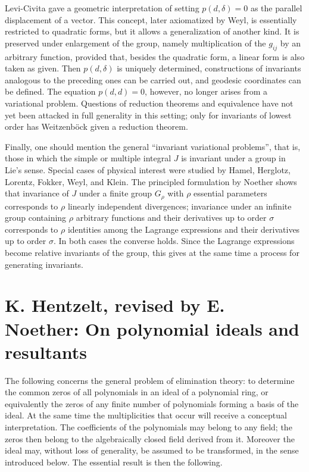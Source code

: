 \documentclass[11pt]{article}
\begin{document}
Levi-Civita gave a geometric interpretation of setting $p(d,\delta)=0$ as the parallel displacement of a vector. This concept, later axiomatized by Weyl, is essentially restricted to quadratic forms, but it allows a generalization of another kind. It is preserved under enlargement of the group, namely multiplication of the $g_{ij}$ by an arbitrary function, provided that, besides the quadratic form, a linear form is also taken as given. Then $p(d,\delta)$ is uniquely determined, constructions of invariants analogous to the preceding ones can be carried out, and geodesic coordinates can be defined. The equation $p(d,d)=0$, however, no longer arises from a variational problem. Questions of reduction theorems and equivalence have not yet been attacked in full generality in this setting; only for invariants of lowest order has Weitzenböck given a reduction theorem.

Finally, one should mention the general ``invariant variational problems'', that is, those in which the simple or multiple integral $J$ is invariant under a group in Lie's sense. Special cases of physical interest were studied by Hamel, Herglotz, Lorentz, Fokker, Weyl, and Klein. The principled formulation by Noether shows that invariance of $J$ under a finite group $G_\rho$ with $\rho$ essential parameters corresponds to $\rho$ linearly independent divergences; invariance under an infinite group containing $\rho$ arbitrary functions and their derivatives up to order $\sigma$ corresponds to $\rho$ identities among the Lagrange expressions and their derivatives up to order $\sigma$. In both cases the converse holds. Since the Lagrange expressions become relative invariants of the group, this gives at the same time a process for generating invariants.

\section{K. Hentzelt, revised by E. Noether: On polynomial ideals and resultants}

The following concerns the general problem of elimination theory: to determine the common zeros of all polynomials in an ideal of a polynomial ring, or equivalently the zeros of any finite number of polynomials forming a basis of the ideal. At the same time the multiplicities that occur will receive a conceptual interpretation. The coefficients of the polynomials may belong to any field; the zeros then belong to the algebraically closed field derived from it. Moreover the ideal may, without loss of generality, be assumed to be transformed, in the sense introduced below. The essential result is then the following.
\end{document}
